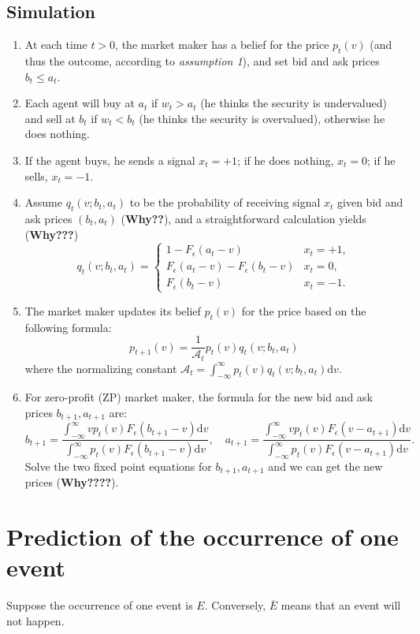 \documentclass{article}
\begin{document}
        \subsection*{Simulation}
        \begin{enumerate}
            \item At each time $t>0$, the market maker has a belief for the price $p_t(v)$ (and thus the outcome, according to \textit{assumption 1}), and set bid and ask prices $b_t\leq a_t$.
            \item Each agent will buy at $a_t$ if $w_t>a_t$ (he thinks the security is undervalued) and sell at $b_t$ if $w_t<b_t$ (he thinks the security is overvalued), otherwise he does nothing. 
            \item If the agent buys, he sends a signal $x_t=+1$; if he does nothing, $x_t=0$; if he sells, $x_t=-1$.
            \item Assume $q_t(v;b_t,a_t)$ to be the probability of receiving signal $x_t$ given bid and ask prices $(b_t,a_t)$ (\textbf{Why??}), and a straightforward calculation yields (\textbf{Why???}) 
            \[ q_t(v;b_t,a_t)=\begin{cases}
                1-F_\epsilon(a_t-v) & x_t=+1,\\
                F_\epsilon(a_t-v)-F_\epsilon(b_t-v) & x_t=0,\\
                F_\epsilon(b_t-v) & x_t=-1.
            \end{cases} \]
            \item The market maker updates its belief $p_t(v)$ for the price based on the following formula:
            \[ p_{t+1}(v)=\dfrac{1}{\mathcal{A}_t}p_t(v)q_t(v;b_t,a_t) \] where the normalizing constant $\mathcal{A}_t=\int_{-\infty}^{\infty}p_t(v)q_t(v;b_t,a_t)\mathrm{d}v$.
            \item For zero-profit (ZP) market maker, the formula for the new bid and ask prices $b_{t+1},a_{t+1}$ are:
            \[ b_{t+1}=\frac{\int_{-\infty}^{\infty}vp_t(v)F_\epsilon(b_{t+1}-v)\mathrm{d}v}{\int_{-\infty}^{\infty}p_t(v)F_\epsilon(b_{t+1}-v)\mathrm{d}v},\quad a_{t+1}=\frac{\int_{-\infty}^{\infty}vp_t(v)F_\epsilon(v-a_{t+1})\mathrm{d}v}{\int_{-\infty}^{\infty}p_t(v)F_\epsilon(v-a_{t+1})\mathrm{d}v}. \]
            Solve the two fixed point equations for $b_{t+1},a_{t+1}$ and we can get the new prices (\textbf{Why????}).
        \end{enumerate}
    \section{Prediction of the occurrence of one event}
    Suppose the occurrence of one event is $E$. Conversely, $\overline{E}$ means that an event will not happen. 
\end{document}
